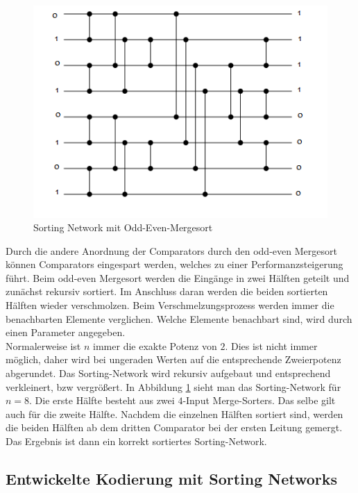 \documentclass[a4,abstract=on]{scrartcl}
\begin{document}
\begin{figure}[H]
\centering
\includegraphics[width=\textwidth]{odd-even-mergesort.png}
\caption{Sorting Network mit Odd-Even-Mergesort}
\label{fig:odd-even-mergesort}
\end{figure}

Durch die andere Anordnung der Comparators durch den odd-even Mergesort können Comparators eingespart werden, welches zu einer Performanzsteigerung führt. Beim odd-even Mergesort werden die Eingänge in zwei Hälften geteilt und zunächst rekursiv sortiert. Im Anschluss daran werden die beiden sortierten Hälften wieder verschmolzen. Beim Verschmelzungsprozess werden immer die benachbarten Elemente verglichen. Welche Elemente benachbart sind, wird durch einen Parameter angegeben.\\
Normalerweise ist $n$ immer die exakte Potenz von $2$. Dies ist nicht immer möglich, daher wird bei ungeraden Werten auf die entsprechende Zweierpotenz abgerundet. Das Sorting-Network wird rekursiv aufgebaut und entsprechend verkleinert, bzw vergrößert. In Abbildung \ref{fig:odd-even-mergesort} sieht man das Sorting-Network für $n=8$. Die erste Hälfte besteht aus zwei $4$-Input Merge-Sorters. Das selbe gilt auch für die zweite Hälfte. Nachdem die einzelnen Hälften sortiert sind, werden die beiden Hälften ab dem dritten Comparator bei der ersten Leitung gemergt. Das Ergebnis ist dann ein korrekt sortiertes Sorting-Network.



	\subsection{Entwickelte Kodierung mit Sorting Networks}
\end{document}
